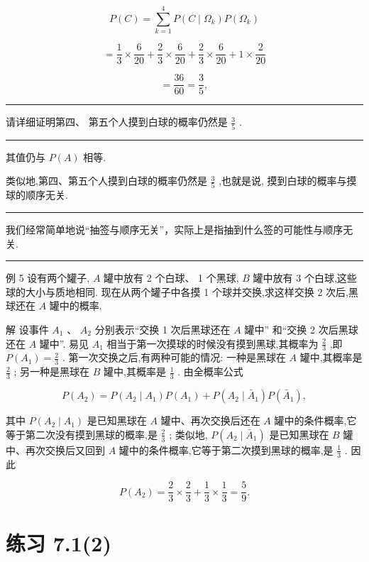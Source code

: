 \documentclass[10pt]{article}
\newcommand{\HRule}{\begin{center}\rule{0.9\linewidth}{0.2mm}\end{center}}
\begin{document}
\[
P\left( C\right)  = \mathop{\sum }\limits_{{k = 1}}^{4}P\left( {C \mid  {\Omega }_{k}}\right) P\left( {\Omega }_{k}\right)
\]

\[
= \frac{1}{3} \times  \frac{6}{20} + \frac{2}{3} \times  \frac{6}{20} + \frac{2}{3} \times  \frac{6}{20} + 1 \times  \frac{2}{20}
\]

\[
= \frac{36}{60} = \frac{3}{5},
\]

\HRule

请详细证明第四、 第五个人摸到白球的概率仍然是 \(\frac{3}{5}\) .

\HRule

其值仍与 \(P\left( A\right)\) 相等.

类似地,第四、第五个人摸到白球的概率仍然是 \(\frac{3}{5}\) ,也就是说, 摸到白球的概率与摸球的顺序无关.

\HRule

我们经常简单地说“抽签与顺序无关”，实际上是指抽到什么签的可能性与顺序无关.

\HRule

例 5 设有两个罐子, \(A\) 罐中放有 2 个白球、 1 个黑球, \(B\) 罐中放有 3 个白球,这些球的大小与质地相同. 现在从两个罐子中各摸 1 个球并交换,求这样交换 2 次后,黑球还在 \(A\) 罐中的概率.

解 设事件 \({A}_{1}\text{ 、 }{A}_{2}\) 分别表示“交换 1 次后黑球还在 \(A\) 罐中” 和“交换 2 次后黑球还在 \(A\) 罐中”. 易见 \({A}_{1}\) 相当于第一次摸球的时候没有摸到黑球,其概率为 \(\frac{2}{3}\) ,即 \(P\left( {A}_{1}\right)  = \frac{2}{3}\) . 第一次交换之后,有两种可能的情况: 一种是黑球在 \(A\) 罐中,其概率是 \(\frac{2}{3}\) ; 另一种是黑球在 \(B\) 罐中,其概率是 \(\frac{1}{3}\) . 由全概率公式

\[
P\left( {A}_{2}\right)  = P\left( {{A}_{2} \mid  {A}_{1}}\right) P\left( {A}_{1}\right)  + P\left( {{A}_{2} \mid  {\bar{A}}_{1}}\right) P\left( {\bar{A}}_{1}\right) ,
\]

其中 \(P\left( {{A}_{2} \mid  {A}_{1}}\right)\) 是已知黑球在 \(A\) 罐中、再次交换后还在 \(A\) 罐中的条件概率,它等于第二次没有摸到黑球的概率,是 \(\frac{2}{3}\) ; 类似地, \(P\left( {{A}_{2} \mid  {\bar{A}}_{1}}\right)\) 是已知黑球在 \(B\) 罐中、再次交换后又回到 \(A\) 罐中的条件概率,它等于第二次摸到黑球的概率,是 \(\frac{1}{3}\) . 因此

\[
P\left( {A}_{2}\right)  = \frac{2}{3} \times  \frac{2}{3} + \frac{1}{3} \times  \frac{1}{3} = \frac{5}{9}.
\]

\section*{练习 7.1(2)}
\end{document}
